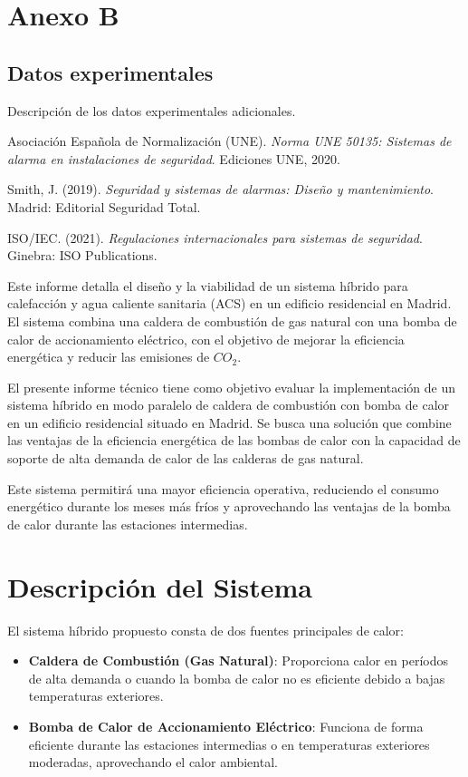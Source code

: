 \documentclass[a4paper,10pt,twocolumn]{article}
\newcommand{\annex}[1]{\section*{Anexo #1} \addcontentsline{toc}{section}{Anexo #1}}
\begin{document}
\begin{Form}
	\lipsum[5]  %

	\annex{B}
	\subsection{Datos experimentales}
	Descripción de los datos experimentales adicionales.


\newpage
\begin{thebibliography}{9}
    Asociación Española de Normalización (UNE). \textit{Norma UNE 50135: Sistemas de alarma en instalaciones de seguridad}. Ediciones UNE, 2020.
    
    Smith, J. (2019). \textit{Seguridad y sistemas de alarmas: Diseño y mantenimiento}. Madrid: Editorial Seguridad Total.
    
    ISO/IEC. (2021). \textit{Regulaciones internacionales para sistemas de seguridad}. Ginebra: ISO Publications.
\end{thebibliography}



	Este informe detalla el diseño y la viabilidad de un sistema híbrido para
	calefacción y agua caliente sanitaria (ACS) en un edificio residencial
	en Madrid. El sistema combina una caldera de combustión de gas natural con
	una bomba de calor de accionamiento eléctrico, con el objetivo de mejorar la
	eficiencia energética y reducir las emisiones de $CO_2$.


	El presente informe técnico tiene como objetivo evaluar la implementación de un sistema híbrido en modo paralelo de caldera de combustión con bomba de calor en un edificio residencial situado en Madrid. Se busca una solución que combine las ventajas de la eficiencia energética de las bombas de calor con la capacidad de soporte de alta demanda de calor de las calderas de gas natural.

	Este sistema permitirá una mayor eficiencia operativa, reduciendo el consumo energético durante los meses más fríos y aprovechando las ventajas de la bomba de calor durante las estaciones intermedias.

	\section{Descripción del Sistema}
	El sistema híbrido propuesto consta de dos fuentes principales de calor:
	\begin{itemize}
		\item \textbf{Caldera de Combustión (Gas Natural)}: Proporciona calor en períodos de alta demanda o cuando la bomba de calor no es eficiente debido a bajas temperaturas exteriores.
		\item \textbf{Bomba de Calor de Accionamiento Eléctrico}: Funciona de forma eficiente durante las estaciones intermedias o en temperaturas exteriores moderadas, aprovechando el calor ambiental.
	\end{itemize}


\end{Form}
\end{document}
